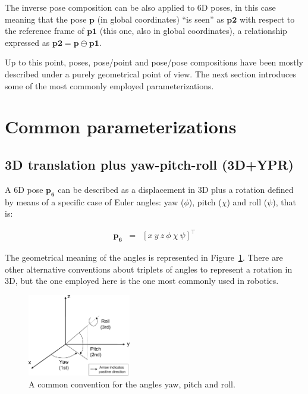 \documentclass[a4paper,11pt]{report}
\begin{document}
The inverse pose composition can be also applied to 6D poses, in this case meaning that
the pose $\mathbf{p}$ (in global coordinates) ``is seen'' as $\mathbf{p2}$ with respect
to the reference frame of $\mathbf{p1}$ (this one, also in global coordinates), a
relationship expressed as $\mathbf{p2} = \mathbf{p} \ominus \mathbf{p1}$.


Up to this point, poses, pose/point and pose/pose compositions have been mostly described
under a purely geometrical point of view.
The next section introduces some of the most commonly employed parameterizations.


\newpage

\section{Common parameterizations}


\subsection{3D translation plus yaw-pitch-roll (3D+YPR)}

A 6D pose $\mathbf{p_6}$ can be described as a displacement in 3D plus a rotation defined by
means of a specific case of Euler angles: yaw ($\phi$), pitch
($\chi$) and roll ($\psi$), that is:

\begin{eqnarray}
\mathbf{p_6} &=& [x ~ y ~ z ~ \phi ~ \chi ~ \psi]^\top
\end{eqnarray}

The geometrical meaning of the angles is represented in Figure~\ref{fig:ypr}.
There are other alternative conventions about triplets of angles to represent a rotation in 3D, but
the one employed here is the one most commonly used in robotics.

\begin{figure}[h]
\centering
\includegraphics[width=0.40\textwidth]{imgs/fig1.pdf}
\caption{A common convention for the angles yaw, pitch and roll.}
\label{fig:ypr}
\end{figure}
\end{document}
